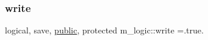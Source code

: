 \mbox{\label{namespacem__logic_a487df89eac953b22a40b143aaf8ff1ea}} 
\subsubsection{\texorpdfstring{write}{write}}
{\footnotesize\ttfamily logical, save, \hyperlink{M__stopwatch_83_8txt_a2f74811300c361e53b430611a7d1769f}{public}, protected m\+\_\+logic\+::write =.true.}

